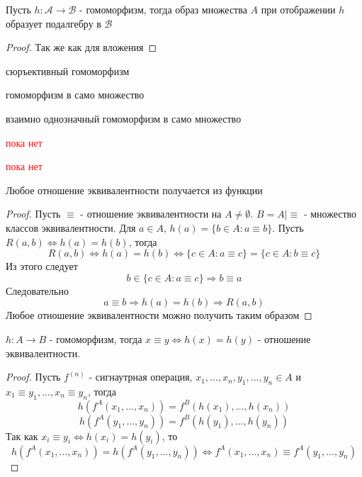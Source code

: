\documentclass[../main/document.tex]{subfiles}
\begin{document}
\begin{thm}
Пусть $h:\mathcal{A}\to \mathcal{B}$ - гомоморфизм, тогда образ множества $A$ при отображении $h$ образует подалгебру в $\mathcal{B}$
\begin{proof}
Так же как для вложения
\end{proof}
\end{thm}
\begin{dfn}[Эпиморфизм]
сюръективный гомоморфизм
\end{dfn}
\begin{exm}

\end{exm}

\begin{dfn}[Эндоморфизм]
гомоморфизм в само множество
\end{dfn}
\begin{exm}

\end{exm}
\begin{dfn}[Автоморфизм]
взаимно однозначный гомоморфизм в само множество
\end{dfn}
\begin{exm}

\end{exm}
\begin{dfn}
\textcolor{red}{пока нет}
\end{dfn}
\begin{dfn}
\textcolor{red}{пока нет}
\end{dfn}
\begin{thm}
Любое отношение эквивалентности получается из функции
\begin{proof}
Пусть $\equiv$ - отношение эквивалентности на $A\neq\emptyset$. $B=A|\equiv$ - множество классов эквивалентности. Для $a\in A,\,h(a)=\{b\in A:a\equiv b\}$. Пусть $R(a,b)\Leftrightarrow h(a)=h(b)$, тогда
$$R(a,b)\Leftrightarrow h(a)=h(b)\Leftrightarrow \{c\in A:a\equiv c\}=\{c\in A:b\equiv c\}$$
Из этого следует
$$b\in\{c\in A:a\equiv c\}\Rightarrow b\equiv a $$
Следовательно
$$a\equiv b\Rightarrow h(a)=h(b)\Rightarrow R(a,b)$$
Любое отношение эквивалентности можно получить таким образом
\end{proof}
\end{thm}
\begin{thm}
$h:A\to B$ - гомоморфизм, тогда $x\equiv y\Leftrightarrow h(x)=h(y)$ - отношение эквивалентности.
\begin{proof}
Пусть $f^{(n)}$ - сигнаутрная операция, $x_1,...,x_n,y_1,...,y_n\in A$ и $x_1\equiv y_1,...,x_n\equiv y_n$, тогда
$$h(f^{A}(x_1,...,x_n))=f^{B}(h(x_1),...,h(x_n))$$
$$h(f^{A}(y_1,...,y_n))=f^{B}(h(y_1),...,h(y_n))$$
Так как $x_i\equiv y_i\Leftrightarrow h(x_i)=h(y_i)$, то
$$h(f^{A}(x_1,...,x_n))=h(f^{A}(y_1,...,y_n))\Leftrightarrow f^{A}(x_1,...,x_n)\equiv f^{A}(y_1,...,y_n)$$
\end{proof}
\end{thm}
\end{document}
